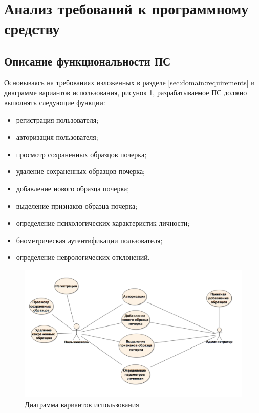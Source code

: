 \section{Анализ требований к программному средству}
\label{sec:freq}
\subsection{Описание функциональности ПС}
Основываясь на требованиях изложенных в разделе \ref{sec:domain:requirements} и диаграмме вариантов использования, рисунок \ref{fig:freg:usecase}, разрабатываемое ПС должно выполнять следующие функции:

\begin{itemize}
	\item регистрация пользователя;
	\item авторизация пользователя;
	\item просмотр сохраненных образцов почерка;
	\item удаление сохраненных образцов почерка;
	\item добавление нового образца почерка;
	\item выделение признаков образца почерка;
	\item определение психологических характеристик личности;
	\item биометрическая аутентификации пользователя;
	\item определение неврологических отклонений.
\end{itemize}
\begin{figure}[ht]
\centering
    \includegraphics[scale=0.4]{figures/use_case.png}  
    \caption{Диаграмма вариантов использования}
  \label{fig:freg:usecase}
\end{figure}

